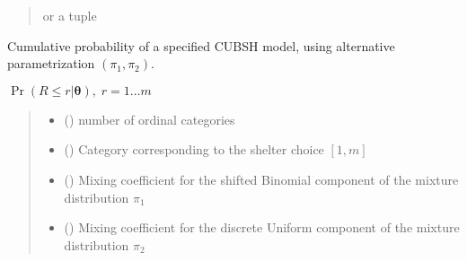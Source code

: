\documentclass[letterpaper,10pt,english]{sphinxmanual}
\begin{document}
\begin{fulllineitems}
\begin{fulllineitems}
\begin{quote}
\begin{description}
\begin{itemize}
\end{itemize}

\sphinxAtStartPar
{} or a tuple 

\end{description}\end{quote}

\end{fulllineitems}


\end{fulllineitems}


\begin{fulllineitems}
\label{\detokenize{cubmods:cubmods.cubsh.cmf}}
\pysigstartsignatures
{}
\pysigstopsignatures
\sphinxAtStartPar
Cumulative probability of a specified CUBSH model,
using alternative parametrization \((\pi_1, \pi_2)\).

\sphinxAtStartPar
\(\Pr(R \leq r | \pmb\theta),\; r=1 \ldots m\)
\begin{quote}\begin{description}
\begin{itemize}
\item {} 
\sphinxAtStartPar
{} () \textendash{} number of ordinal categories

\item {} 
\sphinxAtStartPar
{} () \textendash{} Category corresponding to the shelter choice \([1,m]\)

\item {} 
\sphinxAtStartPar
{} () \textendash{} Mixing coefficient for the shifted Binomial component of the mixture distribution \(\pi_1\)

\item {} 
\sphinxAtStartPar
{} () \textendash{} Mixing coefficient for the discrete Uniform component of the mixture distribution \(\pi_2\)


\end{itemize}
\end{description}
\end{quote}
\end{fulllineitems}
\end{document}
